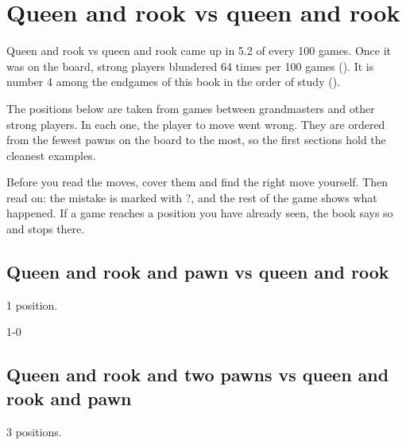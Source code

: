 \chapter{Queen and rook vs queen and rook}\label{ch:queen-and-rook-vs-queen-and-rook}
Queen and rook vs queen and rook came up in 5.2 of every 100 games. Once it was on the board, strong players blundered 64 times per 100 games (). It is number 4 among the endgames of this book in the order of study ().

The positions below are taken from games between grandmasters and other strong players. In each one, the player to move went wrong. They are ordered from the fewest pawns on the board to the most, so the first sections hold the cleanest examples.

Before you read the moves, cover them and find the right move yourself. Then read on: the mistake is marked with ?, and the rest of the game shows what happened. If a game reaches a position you have already seen, the book says so and stops there.


\section{Queen and rook and pawn vs queen and rook}
1 position.


1-0\par
\section{Queen and rook and two pawns vs queen and rook and pawn}
3 positions.



